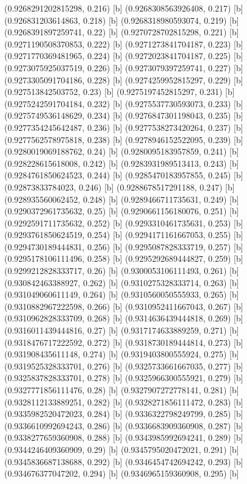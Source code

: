 {{{(0.9268291202815298, 0.216) [b] 
(0.9268308563926408, 0.217) [b] 
(0.926831203614863, 0.218) [b] 
(0.9268318980593074, 0.219) [b] 
(0.9268391897259741, 0.22) [b] 
(0.9270728702815298, 0.221) [b] 
(0.9271190508370853, 0.222) [b] 
(0.9271273841704187, 0.223) [b] 
(0.9271770369481965, 0.224) [b] 
(0.9272023841704187, 0.225) [b] 
(0.9273075925037519, 0.226) [b] 
(0.9273079397259741, 0.227) [b] 
(0.9273305091704186, 0.228) [b] 
(0.9274259952815297, 0.229) [b] 
(0.927513842503752, 0.23) [b] 
(0.9275197452815297, 0.231) [b] 
(0.9275242591704184, 0.232) [b] 
(0.9275537730593073, 0.233) [b] 
(0.9275749536148629, 0.234) [b] 
(0.9276847301198043, 0.235) [b] 
(0.9277354245642487, 0.236) [b] 
(0.9277538273420264, 0.237) [b] 
(0.9277562578975818, 0.238) [b] 
(0.9278946152522095, 0.239) [b] 
(0.9280019069188762, 0.24) [b] 
(0.9280095183957859, 0.241) [b] 
(0.928228615618008, 0.242) [b] 
(0.9283931989513413, 0.243) [b] 
(0.9284761850624523, 0.244) [b] 
(0.9285470183957855, 0.245) [b] 
(0.92873833784023, 0.246) [b] 
(0.9288678517291188, 0.247) [b] 
(0.928935560062452, 0.248) [b] 
(0.9289466711735631, 0.249) [b] 
(0.9290372961735632, 0.25) [b] 
(0.9290661156180076, 0.251) [b] 
(0.9292591711735632, 0.252) [b] 
(0.9293310461735631, 0.253) [b] 
(0.9293761850624519, 0.254) [b] 
(0.9294171161667053, 0.255) [b] 
(0.9294730189444831, 0.256) [b] 
(0.9295087828333719, 0.257) [b] 
(0.9295178106111496, 0.258) [b] 
(0.9295292689444827, 0.259) [b] 
(0.9299212828333717, 0.26) [b] 
(0.9300053106111493, 0.261) [b] 
(0.930842463388927, 0.262) [b] 
(0.9310275328333714, 0.263) [b] 
(0.931049060611149, 0.264) [b] 
(0.9310560050555933, 0.265) [b] 
(0.9310882967222598, 0.266) [b] 
(0.9310952411667043, 0.267) [b] 
(0.9310962828333709, 0.268) [b] 
(0.9314636439444818, 0.269) [b] 
(0.9316011439444816, 0.27) [b] 
(0.9317174633889259, 0.271) [b] 
(0.9318476717222592, 0.272) [b] 
(0.9318730189444814, 0.273) [b] 
(0.931908435611148, 0.274) [b] 
(0.9319403800555924, 0.275) [b] 
(0.9319525328333701, 0.276) [b] 
(0.9325733661667035, 0.277) [b] 
(0.9325837828333701, 0.278) [b] 
(0.9325966300555921, 0.279) [b] 
(0.9327771856111476, 0.28) [b] 
(0.9327907272778141, 0.281) [b] 
(0.9328112133889251, 0.282) [b] 
(0.9328271856111472, 0.283) [b] 
(0.9335982520472023, 0.284) [b] 
(0.9336322798249799, 0.285) [b] 
(0.9336610992694243, 0.286) [b] 
(0.9336683909360908, 0.287) [b] 
(0.9338277659360908, 0.288) [b] 
(0.9343985992694241, 0.289) [b] 
(0.9344246409360909, 0.29) [b] 
(0.9345795020472021, 0.291) [b] 
(0.9345836687138688, 0.292) [b] 
(0.9346454742694242, 0.293) [b] 
(0.934676377047202, 0.294) [b] 
(0.9346965159360908, 0.295) [b] 
}}}
